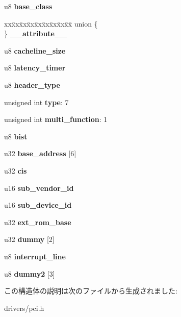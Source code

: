 \begin{DoxyCompactItemize}
\item 
u8 {\bfseries base\-\_\-class}\label{structpci__config__space_afaeda48db0f6f7766964a988ce03d1c2}

\item 
\begin{tabbing}
xx\=xx\=xx\=xx\=xx\=xx\=xx\=xx\=xx\=\kill
union \{\\
\} {\bfseries \_\_attribute\_\_}\label{structpci__config__space_a5f21aec18b44eab179b16f6b349f15a6}
\\

\end{tabbing}\item 
u8 {\bfseries cacheline\-\_\-size}\label{structpci__config__space_a9d30cd8954616966696bfb5c6ccb41d8}

\item 
u8 {\bfseries latency\-\_\-timer}\label{structpci__config__space_adcc149ec855fcf86a9317f0f3df9f022}

\item 
u8 {\bfseries header\-\_\-type}\label{structpci__config__space_abfdce47c3419ff08cb740b3cb29fb558}

\item 
unsigned int {\bfseries type}\-: 7\label{structpci__config__space_a3555cd9d961881ce4ef4e776a5463ccc}

\item 
unsigned int {\bfseries multi\-\_\-function}\-: 1\label{structpci__config__space_a7781b09e1fe543c124be3ad47d1ff5ab}

\item 
u8 {\bfseries bist}\label{structpci__config__space_abc8eae00c6f63b2f4fb06b1ad0dafd60}

\item 
u32 {\bfseries base\-\_\-address} [6]\label{structpci__config__space_a29364b92cce2c313eb132325ef016504}

\item 
u32 {\bfseries cis}\label{structpci__config__space_a07a8eeefb7cac9c93c60183dd2d1f739}

\item 
u16 {\bfseries sub\-\_\-vendor\-\_\-id}\label{structpci__config__space_ab318a205b5172b730380b1544fd06c56}

\item 
u16 {\bfseries sub\-\_\-device\-\_\-id}\label{structpci__config__space_a06571b6d9147634135107330cec71437}

\item 
u32 {\bfseries ext\-\_\-rom\-\_\-base}\label{structpci__config__space_a6c3b3c4085a8e532f3ff93b8fc6e17c8}

\item 
u32 {\bfseries dummy} [2]\label{structpci__config__space_a08bea52a4576825eb5b66acab4f6171e}

\item 
u8 {\bfseries interrupt\-\_\-line}\label{structpci__config__space_a8e48e8f43d55905948b4621c431b9380}

\item 
u8 {\bfseries dummy2} [3]\label{structpci__config__space_aea63683e8b98ce03801d73976a293abd}

\end{DoxyCompactItemize}


この構造体の説明は次のファイルから生成されました\-:\begin{DoxyCompactItemize}
\item 
drivers/pci.\-h\end{DoxyCompactItemize}
